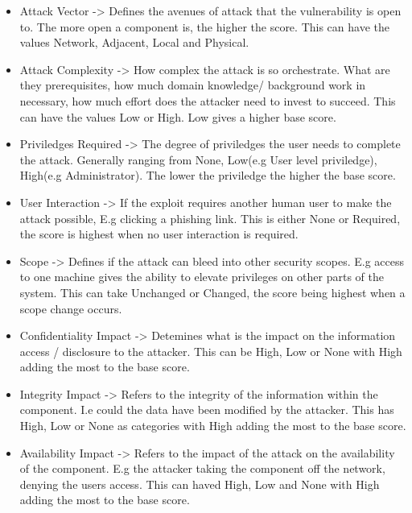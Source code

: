 \documentclass[12pt]{article}
\begin{document}
\begin{itemize}

	\item Attack Vector -> Defines the avenues of attack that the vulnerability is open to. The more open a
	      component is, the higher the score. This can have the values Network, Adjacent, Local and Physical.

	\item Attack Complexity -> How complex the attack is so orchestrate. What are they prerequisites, how much
	      domain knowledge/ background work in necessary, how much effort does the attacker need to invest to
	      succeed. This can have the values Low or High. Low gives a higher base score.

	\item Priviledges Required -> The degree of priviledges the user needs to complete the attack. Generally
	      ranging from None, Low(e.g User level priviledge), High(e.g Administrator). The lower the priviledge
	      the higher the base score.

	\item User Interaction -> If the exploit requires another human user to make the attack possible, E.g
	      clicking a phishing link. This is either None or Required, the score is highest when no user
	      interaction is required.

	\item Scope -> Defines if the attack can bleed into other security scopes. E.g access to one machine gives
	      the ability to elevate privileges on other parts of the system. This can take Unchanged or Changed,
	      the score being highest when a scope change occurs.

	\item Confidentiality Impact -> Detemines what is the impact on the information access / disclosure to the
	      attacker. This can be High, Low or None with High adding the most to the base score.

	\item Integrity Impact -> Refers to the integrity of the information within the component. I.e could the
	      data have been modified by the attacker. This has High, Low or None as categories with High adding the
	      most to the base score.

	\item Availability Impact -> Refers to the impact of the attack on the availability of the component. E.g
	      the attacker taking the component off the network, denying the users access. This can haved High, Low
	      and None with High adding the most to the base score.

\end{itemize}
\end{document}
